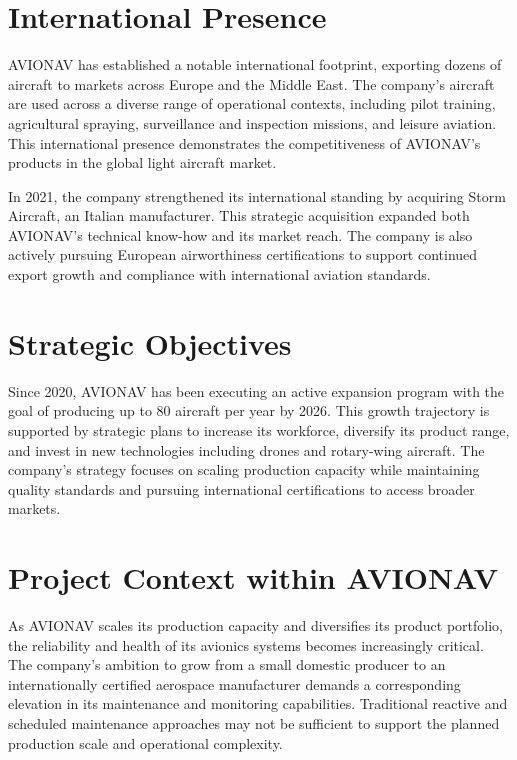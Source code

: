 \section{International Presence}

AVIONAV has established a notable international footprint, exporting dozens of aircraft to markets across Europe and the Middle East. The company's aircraft are used across a diverse range of operational contexts, including pilot training, agricultural spraying, surveillance and inspection missions, and leisure aviation. This international presence demonstrates the competitiveness of AVIONAV's products in the global light aircraft market.

In 2021, the company strengthened its international standing by acquiring Storm Aircraft, an Italian manufacturer. This strategic acquisition expanded both AVIONAV's technical know-how and its market reach. The company is also actively pursuing European airworthiness certifications to support continued export growth and compliance with international aviation standards.

\section{Strategic Objectives}

Since 2020, AVIONAV has been executing an active expansion program with the goal of producing up to 80 aircraft per year by 2026. This growth trajectory is supported by strategic plans to increase its workforce, diversify its product range, and invest in new technologies including drones and rotary-wing aircraft. The company's strategy focuses on scaling production capacity while maintaining quality standards and pursuing international certifications to access broader markets.

\section{Project Context within AVIONAV}

As AVIONAV scales its production capacity and diversifies its product portfolio, the reliability and health of its avionics systems becomes increasingly critical. The company's ambition to grow from a small domestic producer to an internationally certified aerospace manufacturer demands a corresponding elevation in its maintenance and monitoring capabilities. Traditional reactive and scheduled maintenance approaches may not be sufficient to support the planned production scale and operational complexity.

